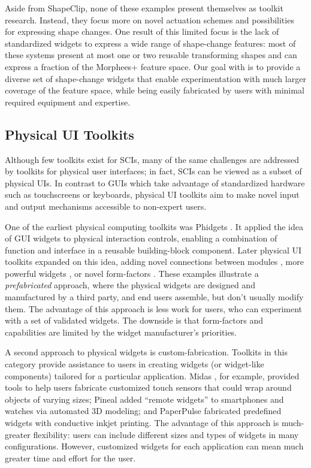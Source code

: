       Aside from ShapeClip, none of these examples present themselves as toolkit
      research. Instead, they focus more on novel actuation schemes and
      possibilities for expressing shape changes. One result of this limited
      focus is the lack of standardized widgets to express a wide range of
      shape-change features: most of these systems present at most one or two
      reusable transforming shapes and can express a fraction of the Morphees+
      \cite{10.1145/3173574.3174193} feature space. Our goal with \mp is to
      provide a diverse set of shape-change widgets that enable experimentation
      with much larger coverage of the feature space, while being easily
      fabricated by users with minimal required equipment and expertise.
        
    \subsection{Physical UI Toolkits}
      Although few toolkits exist for SCIs, many of the same challenges are
      addressed by toolkits for physical user interfaces; in fact, SCIs can be
      viewed as a subset of physical UIs. In contrast to GUIs which take
      advantage of standardized hardware such as touchscreens or keyboards,
      physical UI toolkits aim to make novel input and output mechanisms
      accessible to non-expert users.
      
      One of the earliest physical computing toolkits was Phidgets
      \cite{Greenberg:2001}. It applied the idea of GUI widgets to physical
      interaction controls, enabling a combination of function and interface in
      a reusable building-block component. Later physical UI toolkits expanded
      on this idea, adding novel connections between modules
      \cite{Bdeir:2009kz}, more powerful widgets \cite{Villar:2012hd}, or novel
      form-factors \cite{Hodges:2014}. These examples illustrate a
      \textit{prefabricated} approach, where the physical widgets are designed
      and manufactured by a third party, and end users assemble, but don't
      usually modify them. The advantage of this approach is less work for
      users, who can experiment with a set of validated widgets. The downside is
      that form-factors and capabilities are limited by the widget
      manufacturer's priorities.
      
      A second approach to physical widgets is custom-fabrication. Toolkits in
      this category provide assistance to users in creating widgets (or
      widget-like components) tailored for a particular application. Midas
      \cite{Savage:2012ev}, for example, provided tools to help users fabricate
      customized touch sensors that could wrap around objects of varying sizes;
      Pineal \cite{Ledo:2017ks} added ``remote widgets'' to smartphones and
      watches via automated 3D modeling; and PaperPulse \cite{Ramakers:2015gi}
      fabricated predefined widgets with conductive inkjet printing. The
      advantage of this approach is much-greater flexibility: users can include
      different sizes and types of widgets in many configurations. However,
      customized widgets for each application can mean much greater time and
      effort for the user.
      
